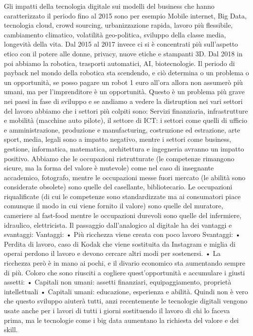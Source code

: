 \documentclass[11pt, a4page, twocolumn]{article}
\begin{document}
Gli impatti della tecnologia digitale sui modelli del business che hanno caratterizzato il periodo fino al 2015 sono per esempio Mobile internet, Big Data, tecnologia cloud, crowd sourcing, urbanizzazione rapida, lavoro più flessibile, cambiamento climatico, volatilità geo-politica, sviluppo della classe media, longevità della vita. Dal 2015 al 2017 invece ci si è concentrati più sull’aspetto etico con il potere alle donne, privacy, nuove etiche e stampanti 3D. Dal 2018 in poi abbiamo la robotica, trasporti automatici, AI, biotecnologie.
Il periodo di payback nel mondo della robotica sta scendendo, e ciò determina o un problema o un opportunità, se posso pagare un robot 1 euro all’ora allora non assumerò più umani, ma per l’imprenditore è un opportunità. Questo è un problema più grave nei paesi in fase di sviluppo e se andiamo a vedere la distruption nei vari settori del lavoro abbiamo che i settori più colpiti sono: Servizi finanziaria, infrastrutture e mobilità (macchine auto pilote), il settore di ICT: i settori come quelli di ufficio e amministrazione, produzione e manufacturing, costruzione ed estrazione, arte sport, media, legali sono a impatto negativo, mentre i settori come business, gestione, informatica, matematica, architettura e ingegneria avranno un impatto positivo. 
Abbiamo che le occupazioni ristrutturate (le competenze rimangono sicure, ma la forma del valore è mutevole) come nel caso di insegnante accademico, fotografo, mentre le occupazioni messe fuori mercato (le abilità sono considerate obsolete) sono quelle del casellante, bibliotecario. Le occupazioni riqualificate (di cui le competenze sono standardizzate ma ai consumatori piace comunque il modo in cui viene fornito il valore) sono quelle del muratore, cameriere al fast-food mentre le occupazioni durevoli sono quelle del infermiere, idraulico, elettricista. 
Il passaggio dall’analogico al digitale ha dei vantaggi e svantaggi:
Vantaggi:
    • Più ricchezza viene creata con poco lavoro
Svantaggi: 
    • Perdita di lavoro, caso di Kodak che viene sostituita da Instagram e miglia di operai perdono il lavoro e devono cercare altri modi per sostenersi.
    • La ricchezza però è in mano ai pochi, e il divario economico sta aumentando sempre di più.
Coloro che sono riusciti a cogliere quest’opportunità e accumulare i giusti assetti:
    • Capitali non umani: assetti finanziari, equipaggiamento, proprietà intellettuali
    • Capitali umani: educazione, esperienza e abilità.
Quindi non è vero che questo sviluppo aiuterà tutti, anzi recentemente le tecnologie digitali vengono usate anche per i lavori di tutti i giorni sostituendo il lavoro di chi lo faceva prima, ma le tecnologie come i big data aumentano la richiesta del valore e dei skill.
\end{document}
